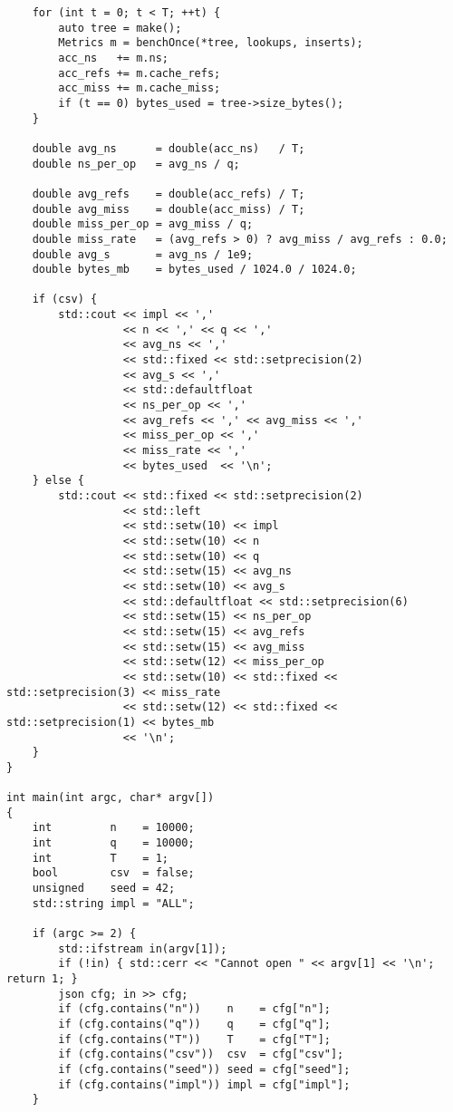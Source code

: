 \begin{lstlisting}
    for (int t = 0; t < T; ++t) {
        auto tree = make();
        Metrics m = benchOnce(*tree, lookups, inserts);
        acc_ns   += m.ns;
        acc_refs += m.cache_refs;
        acc_miss += m.cache_miss;
        if (t == 0) bytes_used = tree->size_bytes();  
    }

    double avg_ns      = double(acc_ns)   / T;
    double ns_per_op   = avg_ns / q;

    double avg_refs    = double(acc_refs) / T;
    double avg_miss    = double(acc_miss) / T;
    double miss_per_op = avg_miss / q;
    double miss_rate   = (avg_refs > 0) ? avg_miss / avg_refs : 0.0;  
    double avg_s       = avg_ns / 1e9;
    double bytes_mb    = bytes_used / 1024.0 / 1024.0;

    if (csv) {
        std::cout << impl << ','
                  << n << ',' << q << ','
                  << avg_ns << ','
                  << std::fixed << std::setprecision(2)
                  << avg_s << ','
                  << std::defaultfloat
                  << ns_per_op << ','
                  << avg_refs << ',' << avg_miss << ','
                  << miss_per_op << ','
                  << miss_rate << ','
                  << bytes_used  << '\n';
    } else {
        std::cout << std::fixed << std::setprecision(2)
                  << std::left
                  << std::setw(10) << impl
                  << std::setw(10) << n
                  << std::setw(10) << q
                  << std::setw(15) << avg_ns
                  << std::setw(10) << avg_s
                  << std::defaultfloat << std::setprecision(6)
                  << std::setw(15) << ns_per_op
                  << std::setw(15) << avg_refs
                  << std::setw(15) << avg_miss
                  << std::setw(12) << miss_per_op
                  << std::setw(10) << std::fixed << std::setprecision(3) << miss_rate
                  << std::setw(12) << std::fixed << std::setprecision(1) << bytes_mb
                  << '\n';
    }
}

int main(int argc, char* argv[])
{
    int         n    = 10000;
    int         q    = 10000;
    int         T    = 1;
    bool        csv  = false;
    unsigned    seed = 42;
    std::string impl = "ALL";

    if (argc >= 2) {
        std::ifstream in(argv[1]);
        if (!in) { std::cerr << "Cannot open " << argv[1] << '\n'; return 1; }
        json cfg; in >> cfg;
        if (cfg.contains("n"))    n    = cfg["n"];
        if (cfg.contains("q"))    q    = cfg["q"];
        if (cfg.contains("T"))    T    = cfg["T"];
        if (cfg.contains("csv"))  csv  = cfg["csv"];
        if (cfg.contains("seed")) seed = cfg["seed"];
        if (cfg.contains("impl")) impl = cfg["impl"];
    }


\end{lstlisting}
